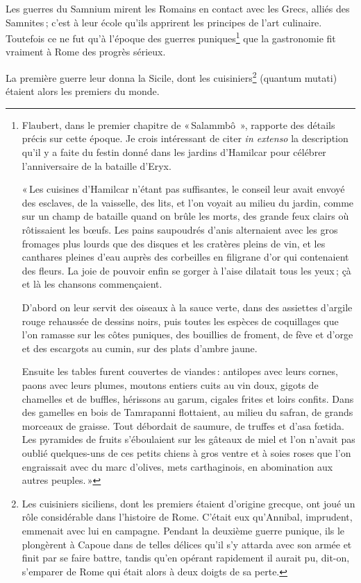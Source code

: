 Les guerres du Samnium mirent les Romains en contact avec les Grecs, alliés des
Samnites ; c'est à leur école qu'ils apprirent les principes de l'art culinaire.
Toutefois ce ne fut qu'à l'époque des guerres puniques\footnote{ Flaubert, dans
le premier chapitre de « Salammbô  », rapporte des détails précis sur cette
époque. Je crois intéressant de citer \textit{in extenso} la description qu'il
y a faite du festin donné dans les jardins d'Hamilcar pour célébrer
l'anniversaire de la bataille d'Eryx.

« Les cuisines d'Hamilcar n'étant pas suffisantes, le conseil leur avait envoyé
des esclaves, de la vaisselle, des lits, et l'on voyait au milieu du jardin,
comme sur un champ de bataille quand on brûle les morts, des grande feux clairs
où rôtissaient les bœufs. Les pains saupoudrés d'anis alternaient avec les gros
fromages plus lourds que des disques et les cratères pleins de vin, et les
canthares pleines d'eau auprès des corbeilles en filigrane d'or qui contenaient
des fleurs. La joie de pouvoir enfin se gorger à l'aise dilatait tous les
yeux ; çà et là les chansons commençaient.

D'abord on leur servit des oiseaux à la sauce verte, dans des assiettes
d'argile rouge rehaussée de dessins noirs, puis toutes les espèces de
coquillages que l'on ramasse sur les côtes puniques, des bouillies de froment,
de fève et d'orge et des escargots au cumin, sur des plats d'ambre jaune.

Ensuite les tables furent couvertes de viandes : antilopes avec leurs cornes,
paons avec leurs plumes, moutons entiers cuits au vin doux, gigots de chamelles
et de buffles, hérissons au garum, cigales frites et loirs confits. Dans des
gamelles en bois de Tamrapanni flottaient, au milieu du safran, de grands
morceaux de graisse. Tout débordait de saumure, de truffes et d'asa fœtida. Les
pyramides de fruits s'éboulaient sur les gâteaux de miel et l'on n'avait pas
oublié quelques-uns de ces petits chiens à gros ventre et à soies roses que
l'on engraissait avec du marc d'olives, mets carthaginois, en abomination aux
autres peuples. »} que la gastronomie fit vraiment à Rome des progrès sérieux.

La première guerre leur donna la Sicile, dont les cuisiniers\footnote{Les
cuisiniers siciliens, dont les premiers étaient d'origine grecque, ont joué un
rôle considérable dans l'histoire de Rome. C'était eux qu'Annibal, imprudent,
emmenait avec lui en campagne. Pendant la deuxième guerre punique, ils le
plongèrent à Capoue dans de telles délices qu'il s'y attarda avec son armée et
finit par se faire battre, tandis qu'en opérant rapidement il aurait pu,
dit-on, s'emparer de Rome qui était alors à deux doigts de sa perte.} (quantum
mutati) étaient alors les premiers du monde.

